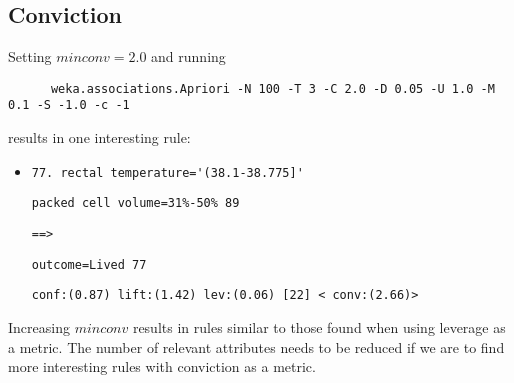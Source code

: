 \subsection{Conviction}
Setting $minconv = 2.0$ and running
\begin{verbatim}
	  weka.associations.Apriori -N 100 -T 3 -C 2.0 -D 0.05 -U 1.0 -M 0.1 -S -1.0 -c -1
\end{verbatim}
results in one interesting rule:
\begin{itemize}
\item \verb|77. rectal temperature='(38.1-38.775]'|

\verb|packed cell volume=31%-50% 89|

\verb|==>|

\verb|outcome=Lived 77|

\verb|conf:(0.87) lift:(1.42) lev:(0.06) [22] < conv:(2.66)>|

\end{itemize}
Increasing $minconv$ results in rules similar to those found when using leverage as a metric. The number of relevant attributes needs to be reduced if we are to find more interesting rules with conviction as a metric.